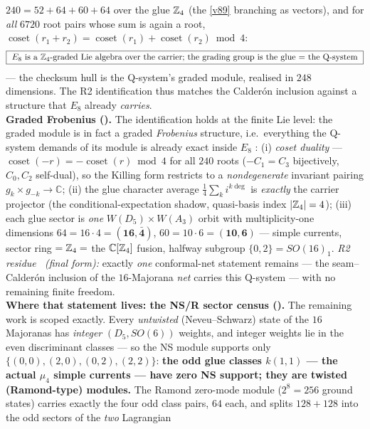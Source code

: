 $240=52+64+60+64$ over the glue $\mathbb Z_4$ (the \vref{v89} branching as vectors), and for \emph{all} $6720$ root
pairs whose sum is again a root, $\operatorname{coset}(r_1{+}r_2)=\operatorname{coset}(r_1)+
\operatorname{coset}(r_2)\bmod4$:
\[
  \boxed{\ E_8\ \text{is a $\mathbb Z_4$-graded Lie algebra over the carrier; the grading group is the glue
  $=$ the Q-system}\ }
\]
--- the checksum hull is the Q-system's graded module, realised in $248$ dimensions. The R2
identification thus matches the Calder\'on inclusion against a structure that $E_8$ already
\emph{carries}. 
\smallskip\\
\noindent\textbf{Graded Frobenius ().} The identification holds at the
finite Lie level: the graded module is in fact a graded \emph{Frobenius} structure,
i.e.\ everything the Q-system demands of its module is already exact inside $E_8$ \mE: (i) \emph{coset
duality} --- $\operatorname{coset}(-r)=-\operatorname{coset}(r)\bmod4$ for all $240$ roots ($-C_1=C_3$
bijectively, $C_0,C_2$ self-dual), so the Killing form restricts to a \emph{nondegenerate} invariant
pairing $g_k\times g_{-k}\to\mathbb C$; (ii) the glue character average $\tfrac14\sum_k i^{k\deg}$ is
\emph{exactly} the carrier projector (the conditional-expectation shadow, quasi-basis index $|\mathbb Z_4|=4$);
(iii) each glue sector is \emph{one} $W(D_5){\times}W(A_3)$ orbit with multiplicity-one dimensions
$64=16\cdot4=(\mathbf{16},\bar{\mathbf4})$, $60=10\cdot6=(\mathbf{10},\mathbf6)$ --- simple currents,
sector ring $=\mathbb Z_4=$ the $\mathbb C[\mathbb Z_4]$ fusion, halfway subgroup $\{0,2\}=SO(16)_1$. \emph{R2 residue
\mC\ (final form):} exactly \emph{one} conformal-net statement remains --- the seam--Calder\'on inclusion
of the $16$-Majorana \emph{net} carries this Q-system --- with no remaining finite freedom.
\smallskip\\
\noindent\textbf{Where that statement lives: the NS/R sector census ().}
The remaining work is scoped exactly. Every \emph{untwisted} (Neveu--Schwarz) state of the $16$
Majoranas has \emph{integer} $(D_5,SO(6))$ weights, and integer weights lie in the even discriminant
classes --- so the NS module supports only $\{(0,0),(2,0),(0,2),(2,2)\}$: \textbf{the odd glue classes
$k(1,1)$ --- the actual $\mu_4$ simple currents --- have zero NS support; they are twisted
(Ramond-type) modules.} The Ramond zero-mode module ($2^8=256$ ground states) carries exactly the four
odd class pairs, $64$ each, and splits $128+128$ into the odd sectors of the \emph{two} Lagrangian
